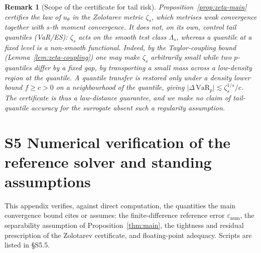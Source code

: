 \documentclass[review,12pt]{elsarticle}
\newtheorem{remark}{Remark}
\begin{document}
\begin{remark}[Scope of the certificate for tail risk]
\label{rem:zeta-not-var}
Proposition~\ref{prop:zeta-main} certifies the law of $u_\theta$ in the
Zolotarev metric $\zeta_s$, which metrises weak convergence together
with $s$-th moment convergence. It does \emph{not}, on its own, control
tail quantiles (VaR/ES): $\zeta_s$ acts on the smooth test class
$\Lambda_s$, whereas a quantile at a fixed level is a non-smooth
functional. Indeed, by the Taylor-coupling bound
(Lemma~\ref{lem:zeta-coupling}) one may make $\zeta_s$ arbitrarily small
while two $p$-quantiles differ by a fixed gap, by transporting a small
mass across a low-density region at the quantile. A quantile transfer is
restored only under a density lower bound $f \ge c > 0$ on a
neighbourhood of the quantile, giving
$\lvert \Delta\,\mathrm{VaR}_p \rvert \lesssim \zeta_s^{1/s}/c$. The
certificate is thus a law-distance guarantee, and we make no claim of
tail-quantile accuracy for the surrogate absent such a regularity
assumption.
\end{remark}

\section*{S5 \quad Numerical verification of the reference solver and standing assumptions}
\label{app:audit}

This appendix verifies, against direct computation, the quantities the
main convergence bound cites or assumes: the finite-difference reference
error $\varepsilon_{\mathrm{num}}$, the separability assumption of
Proposition~\ref{thm:main}, the tightness and residual prescription of
the Zolotarev certificate, and floating-point adequacy. Scripts are
listed in \S S5.5.
\end{document}
